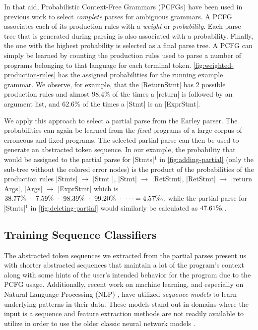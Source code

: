 In that aid, Probabilistic Context-Free Grammars (PCFGs) have been used in
previous work \citep{Collins_2013, Jelinek_1992} to select \emph{complete}
parses for ambiguous grammars. A PCFG associates each of its production rules
with a \emph{weight} or \emph{probability}. Each parse tree that is generated
during parsing is also associated with a probability. Finally, the one with the
highest probability is selected as a final parse tree. A PCFG can simply be
learned \citep{Collins_2013} by counting the production rules used to parse a
number of programs belonging to that language for each terminal token.
\autoref{fig:weighted-production-rules} has the assigned probabilities for the
running example grammar. We observe, for example, that the |ReturnStmt| has 2
possible production rules and almost $98.4\%$ of the times a |return| is
followed by an argument list, and $62.6\%$ of the times a |Stmt| is an
|ExprStmt|.

We apply this approach to select a partial parse from the Earley parser. The
probabilities can again be learned from the \emph{fixed} programs of a large
corpus of erroneous and fixed programs. The selected partial parse can then be
used to generate an abstracted token sequence. In our example, the probability
that would be assigned to the partial parse for |Stmts|$^1$ in
\autoref{fig:adding-partial} (only the sub-tree without the colored error nodes)
is the product of the probabilities of the production rules |Stmts|
$\rightarrow$ |Stmt \n|, |Stmt| $\rightarrow$ |RetStmt|, |RetStmt| $\rightarrow$
|return Args|, |Args| $\rightarrow$ |ExprStmt| \etc which is $38.77\%\ \cdot\
7.59\%\ \cdot\ 98.39\%\ \cdot\ 99.20\%\ \cdot\ \dots =
4.57\text{\textperthousand}$, while the partial parse for |Stmts|$^1$ in
\autoref{fig:deleting-partial} would similarly be calculated as
$47.61\text{\textperthousand}$.

\subsection{Training Sequence Classifiers}
\label{sec:overview:train}
The abstracted token sequences we extracted from the partial parses present us
with shorter abstracted sequences that maintain a lot of the program's context
along with some hints of the user's intended behavior for the program due to the
PCFG usage. Additionally, recent work on machine learning, and especially on
Natural Language Processing (NLP) \citep{Sutskever_2014, Hardalov_2018}, have
utilized \emph{sequence models} to learn underlying patterns in their data.
These models stand out in domains where the input is a sequence and feature
extraction methods are not readily available to utilize in order to use the
older classic neural network models \citep{Sutskever_2014}.

